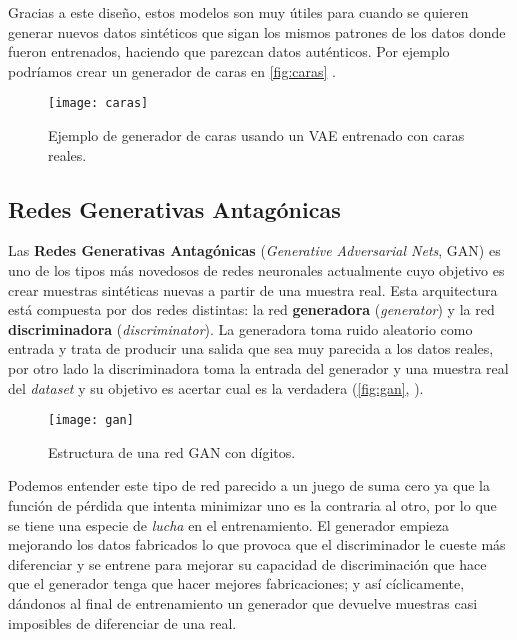 Gracias a este diseño, estos modelos son muy útiles para cuando se quieren generar nuevos datos sintéticos que sigan los mismos patrones de los datos donde fueron entrenados, haciendo que parezcan datos auténticos. Por ejemplo podríamos crear un generador de caras en \autoref{fig:caras} \cite{sancho2020ae}.

\begin{figure}[htpb]
  \centering
  \texttt{[image: caras]}
  \caption{Ejemplo de generador de caras usando un VAE entrenado con caras reales.}
  \label{fig:caras}
\end{figure}

\subsection{Redes Generativas Antagónicas}

Las \textbf{Redes Generativas Antagónicas} (\emph{Generative Adversarial Nets}, GAN) \cite{goodfellow2014generative} es uno de los tipos más novedosos de redes neuronales actualmente cuyo objetivo es crear muestras sintéticas nuevas a partir de una muestra real. Esta arquitectura está compuesta por dos redes distintas: la red \textbf{generadora} (\emph{generator}) y la red \textbf{discriminadora} (\emph{discriminator}). La generadora toma ruido aleatorio como entrada y trata de producir una salida que sea muy parecida a los datos reales, por otro lado la discriminadora toma la entrada del generador y una muestra real del \emph{dataset} y su objetivo es acertar cual es la verdadera (\autoref{fig:gan}, \cite{thalles2018gan}).

\begin{figure}[htpb]
  \centering
  \texttt{[image: gan]}
  \caption{Estructura de una red GAN con dígitos.}
  \label{fig:gan}
\end{figure}

Podemos entender este tipo de red parecido a un juego de suma cero ya que la función de pérdida que intenta minimizar uno es la contraria al otro, por lo que se tiene una especie de \emph{lucha} en el entrenamiento. El generador empieza mejorando los datos fabricados lo que provoca que el discriminador le cueste más diferenciar y se entrene para mejorar su capacidad de discriminación que hace que el generador tenga que hacer mejores fabricaciones; y así cíclicamente, dándonos al final de entrenamiento un generador que devuelve muestras casi imposibles de diferenciar de una real.

